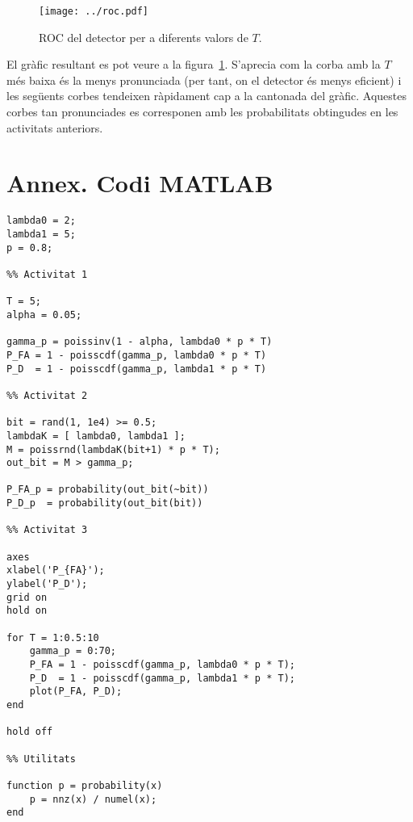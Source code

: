 \documentclass[catalan]{scrartcl}
\begin{document}
\begin{figure}
\center
\texttt{[image: ../roc.pdf]}
\caption{ROC del detector per a diferents valors de $T$. \label{fig:roc}}
\end{figure}

El gràfic resultant es pot veure a la figura~\ref{fig:roc}. S'aprecia
com la corba amb la $T$ més baixa és la menys pronunciada (per tant, on
el detector és menys eficient) i les següents corbes tendeixen ràpidament
cap a la cantonada del gràfic. Aquestes corbes tan pronunciades es corresponen
amb les probabilitats obtingudes en les activitats anteriors.


\clearpage
\part*{Annex. Codi MATLAB}


\begin{verbatim}
lambda0 = 2;
lambda1 = 5;
p = 0.8;

%% Activitat 1

T = 5;
alpha = 0.05;

gamma_p = poissinv(1 - alpha, lambda0 * p * T)
P_FA = 1 - poisscdf(gamma_p, lambda0 * p * T)
P_D  = 1 - poisscdf(gamma_p, lambda1 * p * T)

%% Activitat 2

bit = rand(1, 1e4) >= 0.5;
lambdaK = [ lambda0, lambda1 ];
M = poissrnd(lambdaK(bit+1) * p * T);
out_bit = M > gamma_p;

P_FA_p = probability(out_bit(~bit))
P_D_p  = probability(out_bit(bit))

%% Activitat 3

axes
xlabel('P_{FA}');
ylabel('P_D');
grid on
hold on

for T = 1:0.5:10
    gamma_p = 0:70;
    P_FA = 1 - poisscdf(gamma_p, lambda0 * p * T);
    P_D  = 1 - poisscdf(gamma_p, lambda1 * p * T);
    plot(P_FA, P_D);
end

hold off

%% Utilitats

function p = probability(x)
    p = nnz(x) / numel(x);
end
\end{verbatim}
\end{document}
